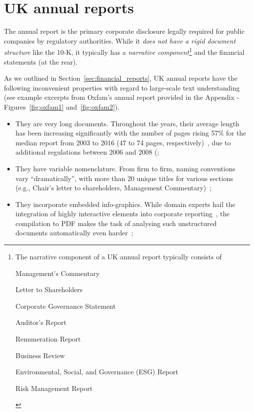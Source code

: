 \section{UK annual reports}\label{sec:uk-annual-reports}
The annual report is the primary corporate disclosure legally required for public companies by regulatory authorities.
While it \emph{does not have a rigid document structure} like the 10-K, it typically has a \emph{narrative component}\footnote{The narrative component of a UK annual report typically consists of
\begin{enumerate*}
    \item Management's Commentary
    \item Letter to Shareholders
    \item Corporate Governance Statement
    \item Auditor's Report
    \item Remuneration Report
    \item Business Review
    \item Environmental, Social, and Governance (ESG) Report
    \item Risk Management Report
\end{enumerate*}
} and the financial statements (at the rear).

As we outlined in Section~\ref{sec:financial_reports}, UK annual reports have the following inconvenient properties with
regard to large-scale text understanding (see example excerpts from Oxfam's annual report provided in the Appendix - Figures~\ref{fig:oxfam1} and~\ref{fig:oxfam2}).
\begin{itemize}
    \item They are very long documents.
    Throughout the years, their average length has been increasing significantly with the number of pages rising 57\% for the median report from 2003 to 2016 (47 to 74 pages, respectively)~\cite{lewis_young_2019}, due to additional regulations between 2006 and 2008 (\cite{el-haj2019retrieving};
    \item They have variable nomenclature.
    From firm to firm, naming conventions vary \enquote{dramatically}, with more than 20 unique titles for various sections (e.g., Chair's letter to shareholders, Management Commentary)~\cite{lewis_young_2019};
    \item They incorporate embedded info-graphics.
    While domain experts hail the integration of highly interactive elements into corporate reporting~\cite{kriz2016future}, the compilation to PDF makes the task of analysing such unstructured documents automatically even harder~\cite{lewis_young_2019};
\end{itemize}

